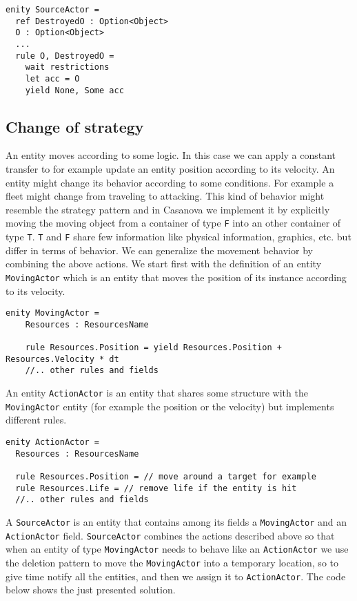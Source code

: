 \begin{lstlisting}
enity SourceActor =
  ref DestroyedO : Option<Object>
  O : Option<Object>
  ...
  rule O, DestroyedO =    
    wait restrictions
    let acc = O
    yield None, Some acc
\end{lstlisting}


\subsection{Change of strategy}
An entity moves according to some logic. In this case we can apply a constant transfer to for example update an entity position according to its velocity. An entity might change its behavior according to some conditions. For example a fleet might change from traveling to attacking. This kind of behavior might resemble the strategy pattern and in Casanova we implement it by explicitly moving the moving object from a container of type \texttt{F} into an other container of type \texttt{T}. \texttt{T} and \texttt{F} share few information like physical information, graphics, etc. but differ in terms of behavior. We can generalize the movement behavior by combining the above actions. We start first with the definition of an entity \texttt{MovingActor} which is an entity that moves the position of its instance according to its velocity.

\begin{lstlisting}
enity MovingActor =
	Resources : ResourcesName
	
	rule Resources.Position = yield Resources.Position + Resources.Velocity * dt
	//.. other rules and fields
\end{lstlisting}

An entity \texttt{ActionActor} is an entity that shares some structure with the \texttt{MovingActor} entity (for example the position or the velocity) but implements different rules.

\begin{lstlisting}
enity ActionActor =
  Resources : ResourcesName
  
  rule Resources.Position = // move around a target for example
  rule Resources.Life = // remove life if the entity is hit
  //.. other rules and fields
\end{lstlisting}

A \texttt{SourceActor} is an entity that contains among its fields a \texttt{MovingActor} and an \texttt{ActionActor} field. \texttt{SourceActor} combines the actions described above so that when an entity of type \texttt{MovingActor} needs to behave like an \texttt{ActionActor} we use the deletion pattern to move the \texttt{MovingActor} into a temporary location, so to give time notify all the entities, and then we assign it to \texttt{ActionActor}. The code below shows the just presented solution.

